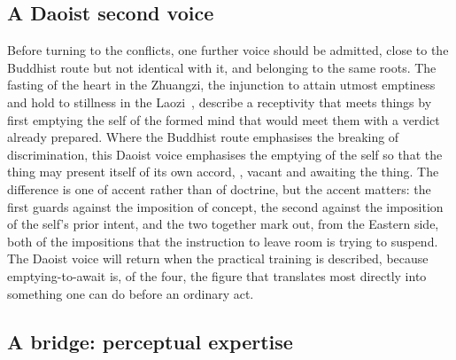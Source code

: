 \subsection{A Daoist second voice}
\label{p22:sub:perception-daoist}

Before turning to the conflicts, one further voice should be admitted, close to the Buddhist route but not identical with it, and belonging to the same roots. The fasting of the heart in the Zhuangzi, the injunction to attain utmost emptiness and hold to stillness in the Laozi~\parencite{zhuangzi,laozi_daodejing}, describe a receptivity that meets things by first emptying the self of the formed mind that would meet them with a verdict already prepared. Where the Buddhist route emphasises the breaking of discrimination, this Daoist voice emphasises the emptying of the self so that the thing may present itself of its own accord, , vacant and awaiting the thing. The difference is one of accent rather than of doctrine, but the accent matters: the first guards against the imposition of concept, the second against the imposition of the self's prior intent, and the two together mark out, from the Eastern side, both of the impositions that the instruction to leave room is trying to suspend. The Daoist voice will return when the practical training is described, because emptying-to-await is, of the four, the figure that translates most directly into something one can do before an ordinary act.

\subsection{A bridge: perceptual expertise}
\label{p22:sub:perception-expertise}

